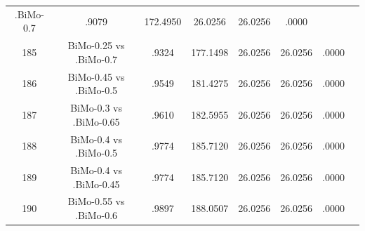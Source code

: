 \documentclass[a4paper,10pt]{article}
\begin{document}
\begin{landscape}
\begin{table}[!htp]
\begin{tabular}{cccccccc}
.BiMo-0.7&.9079&172.4950&26.0256&26.0256&.0000\\185&BiMo-0.25 vs .BiMo-0.7&.9324&177.1498&26.0256&26.0256&.0000\\186&BiMo-0.45 vs .BiMo-0.5&.9549&181.4275&26.0256&26.0256&.0000\\187&BiMo-0.3 vs .BiMo-0.65&.9610&182.5955&26.0256&26.0256&.0000\\188&BiMo-0.4 vs .BiMo-0.5&.9774&185.7120&26.0256&26.0256&.0000\\189&BiMo-0.4 vs .BiMo-0.45&.9774&185.7120&26.0256&26.0256&.0000\\190&BiMo-0.55 vs .BiMo-0.6&.9897&188.0507&26.0256&26.0256&.0000\\\hline
\end{tabular}
\end{table}

\end{landscape}
\end{document}
